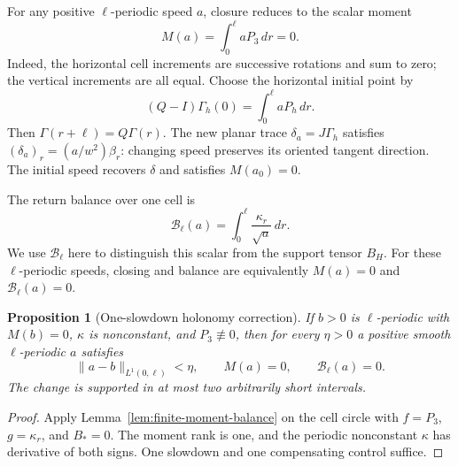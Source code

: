 \documentclass[11pt]{amsart}
\newtheorem{proposition}[theorem]{Proposition}
\theoremstyle{definition}
\theoremstyle{remark}
\numberwithin{equation}{section}
\begin{document}
For any positive $\ell$-periodic speed $a$, closure reduces to the scalar
moment
\begin{equation}\label{eq:closing-moment}
 M(a)=\int_0^\ell aP_3\,dr=0.
\end{equation}
Indeed, the horizontal cell increments are successive rotations and
sum to zero; the vertical increments are all equal. Choose the horizontal
initial point by
\begin{equation}\label{eq:covariant-start}
 (Q-I)\Gamma_h(0)=\int_0^\ell aP_h\,dr.
\end{equation}
Then $\Gamma(r+\ell)=Q\Gamma(r)$. The new planar trace
$\delta_a=J\Gamma_h$ satisfies $(\delta_a)_r=(a/w^2)\beta_r$:
changing speed preserves its oriented tangent direction. The initial
speed recovers $\delta$ and satisfies $M(a_0)=0$.

The return balance over one cell is
\begin{equation}\label{eq:balance-moment}
 \mathscr B_\ell(a)=\int_0^\ell\frac{\kappa_r}{\sqrt a}\,dr.
\end{equation}
We use $\mathscr B_\ell$ here to distinguish this scalar from the support
tensor $B_H$.
For these $\ell$-periodic speeds, closing and balance are equivalently
$M(a)=0$ and $\mathscr B_\ell(a)=0$.

\begin{proposition}[One-slowdown holonomy correction]\label{prop:one-slowdown}
If $b>0$ is $\ell$-periodic with $M(b)=0$, $\kappa$ is nonconstant,
and $P_3\not\equiv0$, then for every $\eta>0$ a positive smooth
$\ell$-periodic $a$ satisfies
\[
 \|a-b\|_{L^1(0,\ell)}<\eta,\qquad M(a)=0,
 \qquad\mathscr B_\ell(a)=0.
\]
The change is supported in at most two arbitrarily short intervals.
\end{proposition}
\begin{proof}
Apply Lemma~\ref{lem:finite-moment-balance} on the cell circle with
$f=P_3$, $g=\kappa_r$, and $B_*=0$. The moment rank is one, and the
periodic nonconstant $\kappa$ has derivative of both signs. One slowdown
and one compensating control suffice.
\end{proof}
\end{document}
